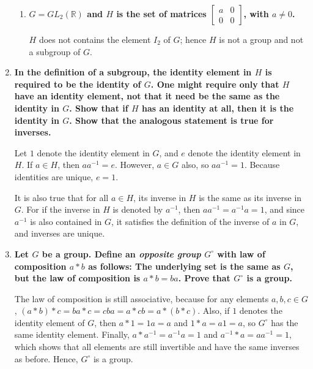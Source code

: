 \documentclass[a4paper,12pt]{article}
\begin{document}
\begin{enumerate}
\begin{enumerate}
            \item
                \boldmath
                \textbf{$G = GL_2(\mathbb{R})$ and $H$ is the set of matrices
                $\left[ \begin{array}{cc}
                        a & 0 \\
                        0 & 0
                \end{array} \right]$, with $a \neq 0$.} \par
                \unboldmath
                $H$ does not contains the element $I_2$ of $G$; hence $H$ is not a group and not a subgroup of $G$.
        \end{enumerate}

    \item
        \boldmath
        \textbf{In the definition of a subgroup, the identity element in $H$ is required to be the identity of $G$. One might require only that $H$ have an identity element, not that it need be the same as the identity in $G$. Show that if $H$ has an identity at all, then it is the identity in $G$. Show that the analogous statement is true for inverses.} \par
        \unboldmath
        Let $1$ denote the identity element in $G$, and $e$ denote the identity element in $H$. If $a \in H$, then $a a^{-1} = e$. However, $a \in G$ also, so $a a^{-1} = 1$. Because identities are unique, $e = 1$. \par
        \iffalse
            For all $a \in H$, if $ae = ea = a$, then because $a$ and $e$ are also contained in $G$ (a superset of $H$), $e$ satisfies the definition of an identity element in $G$. Because identities are unique, $e = 1$. \par
        \fi
        It is also true that for all $a \in H$, its inverse in $H$ is the same as its inverse in $G$. For if the inverse in $H$ is denoted by $a^{-1}$, then $aa^{-1} = a^{-1}a = 1$, and since $a^{-1}$ is also contained in $G$, it satisfies the definition of the inverse of $a$ in $G$, and inverses are unique.

    \item
        \boldmath
        \textbf{Let $G$ be a group. Define an \textit{opposite group} $G^\circ$ with law of composition $a * b$ as follows: The underlying set is the same as $G$, but the law of composition is $a * b = ba$. Prove that $G^\circ$ is a group.} \par
        \unboldmath
        The law of composition is still associative, because for any elements $a, b, c \in G$, $(a * b) * c = ba * c = cba = a * cb = a * (b * c)$. Also, if $1$ denotes the identity element of $G$, then $a * 1 = 1a = a$ and $1 * a = a1 = a$, so $G^\circ$ has the same identity element. Finally, $a * a^{-1} = a^{-1} a = 1$ and $a^{-1} * a = a a^{-1} = 1$, which shows that all elements are still invertible and have the same inverses as before. Hence, $G^\circ$ is a group.
\end{enumerate}
\end{document}
